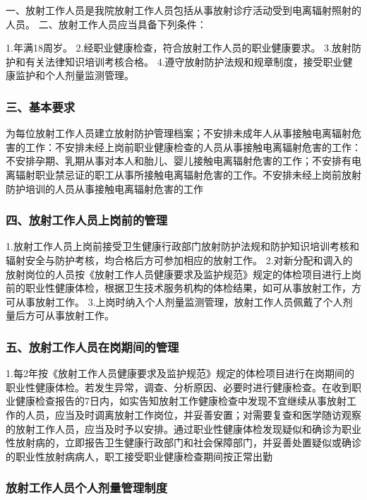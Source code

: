 一、放射工作人员是我院放射工作人员包括从事放射诊疗活动受到电离辐射照射的人员。
二、放射工作人员应当具备下列条件：

1.年满18周岁。
2.经职业健康检查，符合放射工作人员的职业健康要求。
3.放射防护和有关法律知识培训考核合格。
4.遵守放射防护法规和规章制度，接受职业健康监护和个人剂量监测管理。

\subsubsection{三、基本要求}

为每位放射工作人员建立放射防护管理档案；不安排未成年人从事接触电离辐射危害的工作：不安排未经上岗前职业健康检查的人员从事接触电离辐射危害的工作：不安排孕期、乳期从事对本人和胎儿、婴儿接触电离辐射危害的工作；不安排有电离辐射职业禁忌证的职工从事所接触电离辐射危害的工作。不安排未经上岗前放射防护培训的人员从事接触电离辐射危害的工作

\subsubsection{四、放射工作人员上岗前的管理}

1.放射工作人员上岗前接受卫生健康行政部门放射防护法规和防护知识培训考核和辐射安全与防护考核，均合格后方可参加相应的放射工作。
2.对新分配和调入的放射岗位的人员按《放射工作人员健康要求及监护规范》规定的体检项目进行上岗前的职业性健康体检，根据卫生技术服务机构的体检结果，如可从事放射工作，方可从事放射工作。
3.上岗时纳入个人剂量监测管理，放射工作人员佩戴了个人剂量后方可从事放射工作。

\subsubsection{五、放射工作人员在岗期间的管理}

1.每2年按《放射工作人员健康要求及监护规范》规定的体检项目进行在岗期间的职业性健康体检。若发生异常，调查、分析原因、必要时进行健康检查。在收到职业健康检查报告的7日内，如实告知放射工作健康检查中发现不宜继续从事放射工作的人员，应当及时调离放射工作岗位，并妥善安置；对需要复查和医学随访观察的放射工作人员，应当及时予以安排。通过职业性健康体检发现疑似和确诊为职业性放射病的，立即报告卫生健康行政部门和社会保障部门，并妥善处置疑似或确诊的职业性放射病病人，职工接受职业健康检查期间按正常出勤

\subsubsection{放射工作人员个人剂量管理制度}

